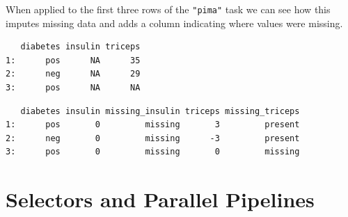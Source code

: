 When applied to the first three rows of the \texttt{"pima"} task we can
see how this imputes missing data and adds a column indicating where
values were missing.

\begin{Shaded}
\begin{Highlighting}[]
\OtherTok{=} \NormalTok{(}\NormalTok{)}\SpecialCharTok{$}\NormalTok{(}\SpecialCharTok{:}\NormalTok{)}
\SpecialCharTok{$}\NormalTok{(} \NormalTok{(}\NormalTok{, }\NormalTok{, }\NormalTok{))}
\end{Highlighting}
\end{Shaded}

\begin{verbatim}
   diabetes insulin triceps
1:      pos      NA      35
2:      neg      NA      29
3:      pos      NA      NA
\end{verbatim}

\begin{Shaded}
\begin{Highlighting}[]
\OtherTok{=}\SpecialCharTok{$}\NormalTok{(tsk\_pima\_head)[[}\NormalTok{]]}
\SpecialCharTok{$}\NormalTok{(} \NormalTok{(}\NormalTok{, }\NormalTok{, }\NormalTok{, }\NormalTok{,}
  \NormalTok{))}
\end{Highlighting}
\end{Shaded}

\begin{verbatim}
   diabetes insulin missing_insulin triceps missing_triceps
1:      pos       0         missing       3         present
2:      neg       0         missing      -3         present
3:      pos       0         missing       0         missing
\end{verbatim}

\hypertarget{selectors-and-parallel-pipelines}{%
\section{Selectors and Parallel
Pipelines}\label{selectors-and-parallel-pipelines}}

